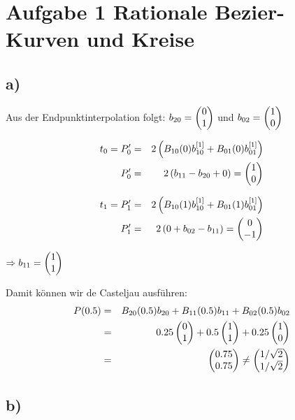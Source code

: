 
\section*{Aufgabe 1 Rationale Bezier-Kurven und Kreise}

\subsection*{a)}

Aus der Endpunktinterpolation folgt: $b_{20} = \left( \begin{matrix}0 \\ 1\end{matrix}\right)$ und $b_{02} = \left( \begin{matrix}1 \\ 0\end{matrix}\right)$

\begin{eqnarray}
    t_0 = P_0' &=& 2 \left( B_{10}(0) b^{[1] }_{10} +B_{01}(0) b^{[1] }_{01} \right)\\
    P_0' &=& 2 \left( b_{11} - b_{20} + 0 \right) = \left( \begin{matrix}1 \\ 0\end{matrix}\right)
\end{eqnarray}

\begin{eqnarray}
    t_1 = P_1' &=& 2 \left( B_{10}(1) b^{[1] }_{10} +B_{01}(1) b^{[1] }_{01} \right)\\
    P_1' &=& 2 \left( 0 +b_{02} - b_{11} \right ) = \left( \begin{matrix}0 \\ -1\end{matrix}\right)
\end{eqnarray}

$\Rightarrow b_{11} = \left( \begin{matrix}1 \\ 1\end{matrix}\right)$

Damit können wir de Casteljau ausführen:
\begin{eqnarray}
    P(0.5)&=& B_{20}(0.5) b_{20} + B_{11}(0.5) b_{11} + B_{02}(0.5) b_{02}\\
    &=& 0.25 \left( \begin{matrix}0 \\ 1\end{matrix}\right) + 0.5 \left( \begin{matrix}1 \\ 1\end{matrix}\right) + 0.25 \left( \begin{matrix}1 \\ 0\end{matrix}\right)\\
    &=& \left( \begin{matrix}0.75 \\ 0.75\end{matrix}\right) \neq \left( \begin{matrix}1/\sqrt{2} \\ 1/\sqrt{2}\end{matrix}\right)
\end{eqnarray}


\subsection*{b)}

